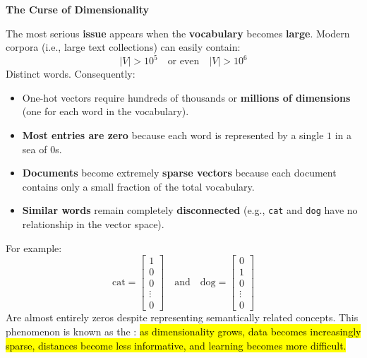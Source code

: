 \highspace
\begin{flushleft}
    \textcolor{Red2}{ \textbf{The Curse of Dimensionality}}\label{def:curse-of-dimensionality}
\end{flushleft}
The most serious \textbf{issue} appears when the \textbf{vocabulary} becomes \textbf{large}. Modern corpora (i.e., large text collections) can easily contain:
\begin{equation*}
    \left|V\right| > 10^{5} \quad \text{or even} \quad \left|V\right| > 10^{6}
\end{equation*}
Distinct words. Consequently:
\begin{itemize}
    \item One-hot vectors require hundreds of thousands or \textbf{millions of dimensions} (one for each word in the vocabulary).
    \item \textbf{Most entries are zero} because each word is represented by a single $1$ in a sea of $0$s.
    \item \textbf{Documents} become extremely \textbf{sparse vectors} because each document contains only a small fraction of the total vocabulary.
    \item \textbf{Similar words} remain completely \textbf{disconnected} (e.g., \texttt{cat} and \texttt{dog} have no relationship in the vector space).
\end{itemize}
For example:
\begin{equation*}
    \text{cat} = \begin{bmatrix}
        1 \\
        0 \\
        0 \\
        \vdots \\
        0
    \end{bmatrix} \quad \text{and} \quad \text{dog} = \begin{bmatrix}
        0 \\
        1 \\
        0 \\
        \vdots \\
        0
    \end{bmatrix}
\end{equation*}
Are almost entirely zeros despite representing semantically related concepts. This phenomenon is known as the : \hl{as dimensionality grows, data becomes increasingly sparse, distances become less informative, and learning becomes more difficult.}

